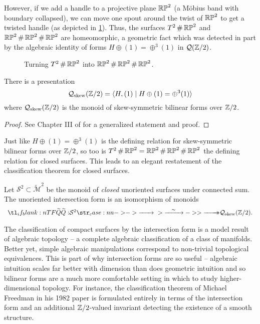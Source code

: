 However, if we add a handle to a projective plane $\mathbb{RP}^2$ (a M\"obius band with boundary collapsed), we can move one spout around the twist of $\mathbb{RP}^2$ to get a twisted handle (as depicted in \cref{fig:twisted-handle-to-handle}). Thus, the surfaces $T^2\,\#\,\mathbb{RP}^2$ and $\mathbb{RP}^2\,\#\,\mathbb{RP}^2\,\#\,\mathbb{RP}^2$ are homeomorphic, a geometric fact which was detected in part by the algebraic identity of forms $H\oplus (1)=\oplus^3(1)$ in $\mathcal{Q}(\mathbb{Z}/2)$.

\begin{figure}
	\centering
	\medskip
	\caption{Turning $T^2\,\#\,\mathbb{RP}^2$ into $\mathbb{RP}^2\,\#\,\mathbb{RP}^2\,\#\,\mathbb{RP}^2$.}\label{fig:twisted-handle-to-handle}
\end{figure}

\begin{proposition}
	There is a presentation
	\[\mathcal{Q}_{\mathrm{skew}}(\mathbb{Z}/2) = \langle H, (1) \mid H\oplus (1) = \oplus^3 (1)\rangle\]
	where $\mathcal{Q}_{\mathrm{skew}}(\mathbb{Z}/2)$ is the monoid of skew-symmetric bilinear forms over $\mathbb{Z}/2$.
\end{proposition}
\begin{proof}
	See Chapter III of \cite{milnorhuse1973forms} for a generalized statement and proof.
\end{proof}

Just like $H\oplus (1)= \oplus^3 (1)$ is the defining relation for skew-symmetric bilinear forms over $\mathbb{Z}/2$, so too is $T^2\,\#\, \mathbb{RP}^2 = \mathbb{RP}^2\,\#\,\mathbb{RP}^2\,\#\,\mathbb{RP}^2$ the defining relation for closed surfaces. This leads to an elegant restatement of the classification theorem for closed surfaces.

\begin{theorem}
	Let $\mathcal{S}^2\subset \widetilde{\mathcal{M}}^2$ be the monoid of \textit{closed} unoriented surfaces under connected sum. The unoriented intersection form is an isomorphism of monoids
	\[
		\lkxfunc{\widetilde{Q}}{\mathcal{S}^2}{\mathcal{Q}_{\mathrm{skew}}(\Z/2).}
	\]
\end{theorem}

The classification of compact surfaces by the intersection form is a model result of algebraic topology -- a complete algebraic classification of a class of manifolds. Better yet, simple algebraic manipulations correspond to non-trivial topological equivalences. This is part of why intersection forms are so useful -- algebraic intuition scales far better with dimension than does geometric intuition and so bilinear forms are a much more comfortable setting in which to study higher-dimensional topology. For instance, the classification theorem of Michael Freedman in his 1982 paper \cite{freedman1982manifold} is formulated entirely in terms of the intersection form and an additional $\mathbb{Z}/2$-valued invariant detecting the existence of a smooth structure.

